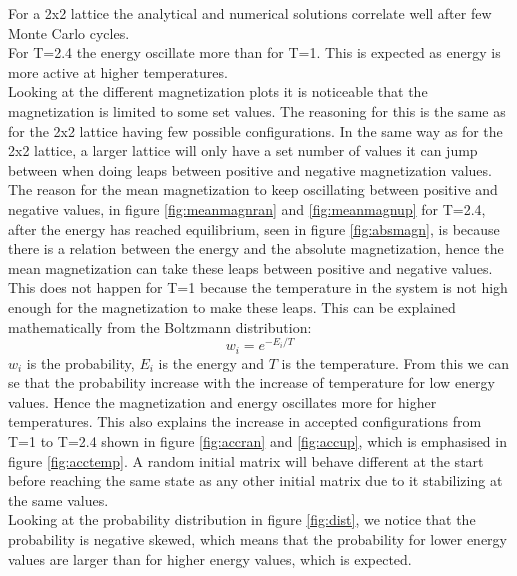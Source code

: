 \documentclass[10pt,a4paper]{article}
\begin{document}
\noindent For a 2x2 lattice the analytical and numerical solutions correlate well after few Monte Carlo cycles.\\
\noindent For T=2.4 the energy oscillate more than for T=1. This is expected as energy is more active at higher temperatures.\\
Looking at the different magnetization plots it is noticeable that the magnetization is limited to some set values. The reasoning for this is the same as for the 2x2 lattice having few possible configurations. In the same way as for the 2x2 lattice, a larger lattice will only have a set number of values it can jump between when doing leaps between positive and negative magnetization values. The reason for the mean magnetization to keep oscillating between positive and negative values, in figure \ref{fig:meanmagnran} and \ref{fig:meanmagnup} for T=2.4, after the energy has reached equilibrium, seen in figure \ref{fig:absmagn}, is because there is a relation between the energy and the absolute magnetization, hence the mean magnetization can take these leaps between positive and negative values. This does not happen for T=1 because the temperature in the system is not high enough for the magnetization to make these leaps. This can be explained mathematically from the Boltzmann distribution: $$w_i=e^{-E_i/T}$$ $w_i$ is the probability, $E_i$ is the energy and $T$ is the temperature. From this we can se that the probability increase with the increase of temperature for low energy values. Hence the magnetization and energy oscillates more for higher temperatures. This also explains the increase in accepted configurations from T=1 to T=2.4 shown in figure \ref{fig:accran} and \ref{fig:accup}, which is emphasised in figure \ref{fig:acctemp}.
A random initial matrix will behave different at the start before reaching the same state as any other initial matrix due to it stabilizing at the same values.\\

\noindent Looking at the probability distribution in figure \ref{fig:dist}, we notice that the probability is negative skewed, which means that the probability for lower energy values are larger than for higher energy values, which is expected.\\
\end{document}
